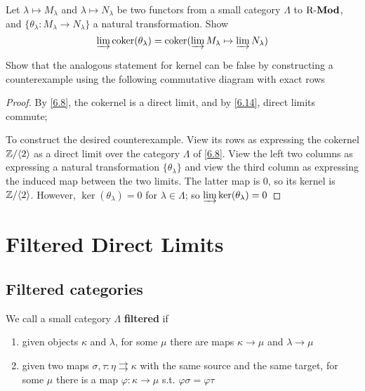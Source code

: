 \documentclass[11pt]{article}
\begin{document}
\begin{exercise}
\label{6.17}
Let \(\lambda\mapsto M_\lambda\) and \(\lambda\mapsto N_\lambda\) be two
functors from a small category \(\Lambda\) to \(\operatorname{R-\textbf{Mod}}\), and
\(\{\theta_\lambda:M_\lambda\to N_\lambda\}\) a natural transformation. Show
\begin{equation*}
\varinjlim\operatorname{coker}(\theta_\lambda)=\operatorname{coker}(\varinjlim M_\lambda\mapsto\varinjlim N_\lambda)
\end{equation*}

Show that the analogous statement for kernel can be false by constructing a
counterexample using the following commutative diagram with exact rows
\begin{center}
\end{center}
\end{exercise}
\begin{proof}
By \ref{6.8}, the cokernel is a direct limit, and by \ref{6.14},  direct limits
commute;

To construct the desired counterexample. View its rows as expressing the
cokernel \(\mathbb{Z}/\langle2\rangle\) as a direct limit over the category \(\Lambda\) of \ref{6.8}.
View the left two columns as expressing a natural transformation
\(\{\theta_\lambda\}\) and view the third column as expressing the induced
map between the two limits. The latter map is 0, so its kernel is
\(\mathbb{Z}/\langle2\rangle\). However, \(\ker(\theta_\lambda)=0\) for
\(\lambda\in\Lambda\); so \(\varinjlim\ker(\theta_\lambda)=0\)
\end{proof}
\section{Filtered Direct Limits}
\label{sec:orgea7545c}
\subsection*{Filtered categories}
\label{sec:org336ed3f}
We call a small category \(\Lambda\) \textbf{filtered} if
\begin{enumerate}
\item given objects \(\kappa\) and \(\lambda\), for some \(\mu\) there are maps \(\kappa\to\mu\) and \(\lambda\to\mu\)
\item given two maps \(\sigma,\tau:\eta\rightrightarrows  \kappa\) with the same source and
the same target, for some \(\mu\) there is a map \(\varphi:\kappa\to\mu\) s.t. \(\varphi\sigma=\varphi\tau\)
\end{enumerate}
\end{document}
